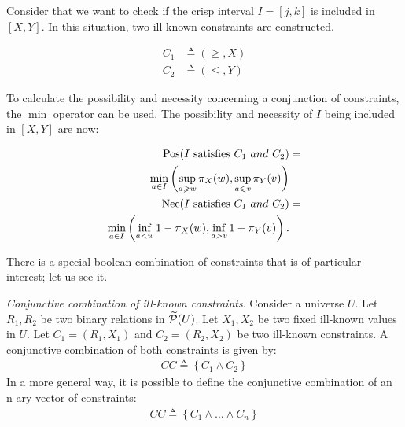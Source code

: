 \begin{example}
Consider that we want to check if the crisp interval $I = \left[j, k\right]$ is included in $\left[X, Y\right]$. In this situation, two ill-known constraints are constructed.


\vspace{-10pt}

\begin{eqnarray}
\label{eq:constraint-c1}
C_1 & \triangleq\left(\geq,X\right)\\
\label{eq:constraint-c2}
C_2 & \triangleq\left(\leq,Y\right)
\end{eqnarray}

To calculate the possibility and necessity concerning a conjunction of constraints, the $\min$ operator can be used. The possibility and necessity of $I$ being included in $\left[X, Y\right]$ are now: %

\vspace{-10pt}

\begin{align}
\label{eq:interval-pos}
\operatorname{Pos}(I\text{ satisfies }C_1\ and\ C_2) & =\\
\nonumber
\min_{a \in I}\left(\sup_{a \geqslant w}\pi_{X}(w),\sup_{a \leqslant v}\pi_{Y}(v)\right)\\
\label{eq:interval-nec}
\operatorname{Nec}(I\text{ satisfies }C_1\ and\ C_2) & =\\
\nonumber
\min_{a \in I}\left(\inf_{a < w} 1-\pi_{X}(w),\inf_{a > v} 1-\pi_{Y}(v)\right).
\end{align}
\end{example}

There is a special boolean combination of constraints that is of particular interest; let us see it.
\begin{definition}
\emph{Conjunctive combination of ill-known constraints}. Consider a universe $U$. Let $R_1, R_2$ be two binary relations in  $\widetilde{\mathcal{P}}(U)$. Let $X_1, X_2$ be two fixed ill-known values in $U$. Let  $C_1 = (R_1, X_1)$ and $C_2 = (R_2, X_2)$ be two ill-known constraints. A conjunctive combination of both constraints is given by:
\begin{align}
\label{eq:convex-combination}
CC \triangleq \left \lbrace C_1 \wedge C_2 \right \rbrace
\end{align}
In a more general way, it is possible to define the conjunctive combination of an n-ary vector of constraints:
\begin{align}
\label{eq:nary-convex-combination}
CC \triangleq \left \lbrace C_1 \wedge \ldots \wedge C_n \right \rbrace
\end{align}
\end{definition}

